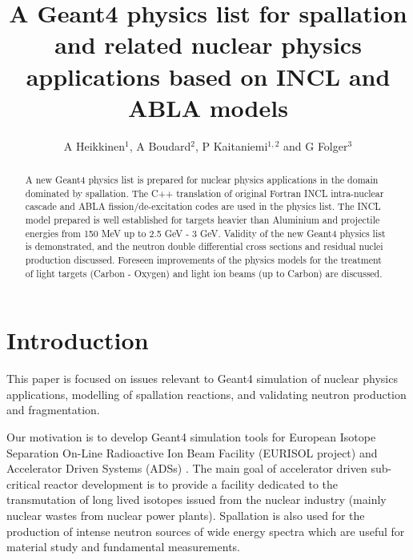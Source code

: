 \documentclass[a4paper]{jpconf}
\begin{document}
\title{A Geant4 physics list for spallation and related nuclear physics applications 
based on INCL and ABLA models}

\author{A Heikkinen$^1$, A Boudard$^2$, P Kaitaniemi$^{1,2}$ and G Folger$^3$}
\address{$^1$ Helsinki Institute of Physics, P.O. Box 64, FIN-00014 University of Helsinki, Finland}
\address{$^2$ CEN-Saclay, CEA-IRFU/SPhN, 91 191 Gif sur Yvette, France}
\address{$^3$ European Organization for Nuclear Research (CERN), Switzerland}


\begin{abstract}
A new Geant4 physics list is prepared for nuclear physics applications
in the domain dominated by spallation.
The C++ translation of original Fortran INCL intra-nuclear 
cascade and ABLA fission/de-excitation codes 
are used in the physics list.
The INCL model prepared is well established for targets heavier than Aluminium
and projectile energies from 150 MeV up to 2.5 GeV - 3 GeV.
Validity of the new Geant4 physics list is demonstrated, 
and the neutron double differential cross sections and residual nuclei production discussed.
Foreseen improvements of the physics models for the treatment of light targets (Carbon - Oxygen)
and light ion beams (up to Carbon) are discussed.
\end{abstract}

\section{Introduction} \label{sec:intro}
This paper is focused on issues relevant to Geant4 \cite{geant4} simulation of nuclear physics applications,
modelling of spallation reactions, and validating neutron production and fragmentation.

Our motivation is to develop Geant4 simulation tools for European Isotope Separation On-Line
Radioactive Ion Beam Facility (EURISOL project) \cite{eurisol} and 
Accelerator Driven Systems (ADSs) \cite{ads}. 
The main goal of accelerator driven sub-critical reactor development
is to provide a facility dedicated to the transmutation of long lived
isotopes issued from the nuclear industry (mainly nuclear wastes from
nuclear power plants).  Spallation is also used for the production
of intense neutron sources of wide energy spectra which are useful for
material study and fundamental measurements.
\end{document}
